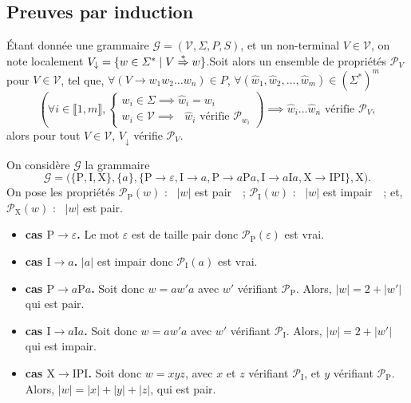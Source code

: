 \subsection{Preuves par induction}

\begin{prop}
	Étant donnée une grammaire $\mathcal{G} = (\mathcal{V}, \Sigma, P, S)$, et un non-terminal $V \in \mathcal{V}$, on note localement $V_{\downarrow} = \{w \in \varSigma^*  \mid V\mathrel{\overset*\Rightarrow} w\}$.\footnotemark\@ Soit alors un ensemble de propriétés $\mathcal{P}_V$ pour $V \in \mathcal{V}$, tel que, $\forall (V \to w_1 w_2 \ldots w_n) \in P$, $\forall (\hat{w}_1, \hat{w}_2, \ldots, \hat{w}_m) \in (\Sigma^*)^m$ \[
		\left(\forall i \in \llbracket 1,m \rrbracket, \begin{cases}
			w_i \in \Sigma \implies \hat{w}_i = w_i\\
			w_i \in \mathcal{V} \implies \text{ $\hat{w}_i$ vérifie $\mathcal{P}_{w_i}$}
		\end{cases}\right)
		\implies \hat{w}_i\ldots \hat{w}_n \text{ vérifie } \mathcal{P}_V
	,\]
	alors pour tout $V \in \mathcal{V}$, $V_\downarrow$ vérifie $\mathcal{P}_V$.
\end{prop}

\begin{exm}
	On considère $\mathcal{G}$ la grammaire \[
		\mathcal{G} = \big(\{\mathrm{P},\mathrm{I},\mathrm{X}\}, \{a\}, \{\mathrm{P}\to \varepsilon, \mathrm{I} \to a, \mathrm{P} \to a \mathrm{P} a, \mathrm{I} \to a \mathrm{I} a, \mathrm{X} \to \mathrm{IPI}\}, \mathrm{X} \big)
	.\]
	On pose les propriétés $\mathcal{P}_\mathrm{P}(w)$ : \guillemotleft~$|w|$ est pair~\guillemotright\ ; $\mathcal{P}_\mathrm{I}(w)$ : \guillemotleft~$|w|$ est impair~\guillemotright\ ; et, $\mathcal{P}_\mathrm{X}(w)$ : \guillemotleft~$|w|$ est pair.~\guillemotright\ 
	\begin{itemize}
		\item \textbf{cas $\mathrm{P} \to \varepsilon$.} Le mot $\varepsilon$ est de taille pair donc $\mathcal{P}_\mathrm{P}(\varepsilon)$ est vrai.
		\item \textbf{cas $\mathrm{I} \to a$.} $|a|$ est impair donc $\mathcal{P}_\mathrm{I}(a)$ est vrai.
		\item \textbf{cas $\mathrm{P} \to a \mathrm{P} a$.}
			Soit donc $w = a w' a$ avec $w'$ vérifiant $\mathcal{P}_\mathrm{P}$.
			Alors, $|w| = 2 + |w'|$ qui est pair.
		\item \textbf{cas $\mathrm{I} \to a \mathrm{I} a$.}
			Soit donc $w = a w' a$ avec $w'$ vérifiant $\mathcal{P}_\mathrm{I}$.
			Alors, $|w| = 2 + |w'|$ qui est impair.
		\item \textbf{cas $\mathrm{X} \to \mathrm{IPI}$.}
			Soit donc $w = x y z$, avec $x$ et $z$ vérifiant $\mathcal{P}_\mathrm{I}$, et $y$ vérifiant $\mathcal{P}_\mathrm{P}$.
			Alors, $|w| = |x| + |y| + |z|$, qui est pair.
	\end{itemize}
\end{exm}
